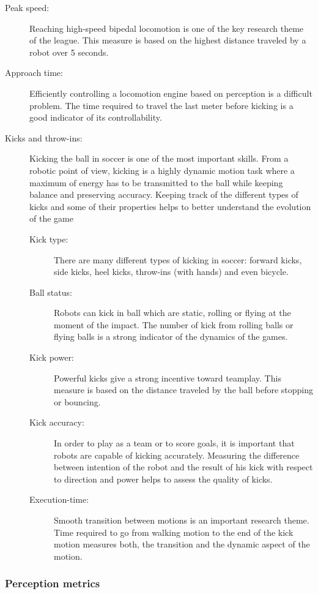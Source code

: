 \documentclass{article}
\begin{document}
\begin{description}
\item[Peak speed:] Reaching high-speed bipedal locomotion is one of the key
  research theme of the league.
  This measure is based on the highest distance traveled by a robot over 5 seconds.
  
\item[Approach time:] Efficiently controlling a locomotion engine based on perception
  is a difficult problem.
  The time required to travel the last meter before kicking is a good indicator
  of its controllability.

\item[Kicks and throw-ins:] Kicking the ball in soccer is one of the most important
  skills.
  From a robotic point of view, kicking is a highly dynamic motion task where
  a maximum of energy has to be transmitted to the ball while keeping balance
  and preserving accuracy.
  Keeping track of the different types of kicks and some of their properties helps
  to better understand the evolution of the game
  \begin{description}
  \item[Kick type:] There are many different types of kicking in soccer:
    forward kicks, side kicks, heel kicks, throw-ins (with hands) and even bicycle.
  \item[Ball status:] Robots can kick in ball which are static, rolling or
    flying at the moment of the impact.
    The number of kick from rolling balls or flying balls is a strong indicator
    of the dynamics of the games.
  \item[Kick power:] Powerful kicks give a strong incentive toward teamplay.
    This measure is based on the distance traveled by the ball before stopping or bouncing.
  \item[Kick accuracy:] In order to play as a team or to score goals, it is
    important that robots are capable of kicking accurately.
    Measuring the difference between intention of the robot and the result of his kick with
    respect to direction and power helps to assess the quality of kicks.
  \item[Execution-time:] Smooth transition between motions is an important research theme.
    Time required to go from walking motion to the end of the kick motion measures both,
    the transition and the dynamic aspect of the motion.
  \end{description}
\end{description}


\subsubsection{Perception metrics}
\end{document}
